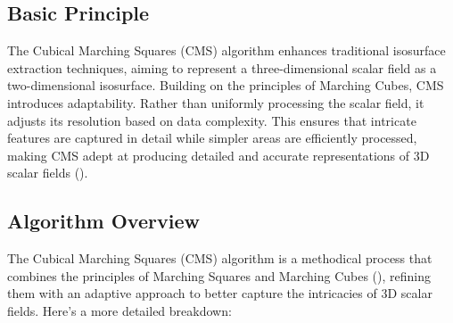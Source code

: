 \subsection{Basic Principle}

The Cubical Marching Squares (CMS) algorithm enhances traditional isosurface extraction techniques, aiming to represent a three-dimensional scalar field as a two-dimensional isosurface. Building on the principles of Marching Cubes, CMS introduces adaptability. Rather than uniformly processing the scalar field, it adjusts its resolution based on data complexity. This ensures that intricate features are captured in detail while simpler areas are efficiently processed, making CMS adept at producing detailed and accurate representations of 3D scalar fields (\cite{Chien-Chang_2005}).

\vspace{2mm}
\subsection{Algorithm Overview}

The Cubical Marching Squares (CMS) algorithm is a methodical process that combines the principles of Marching Squares and Marching Cubes (\cite{Lorensen_1987}), refining them with an adaptive approach to better capture the intricacies of 3D scalar fields. Here's a more detailed breakdown:


